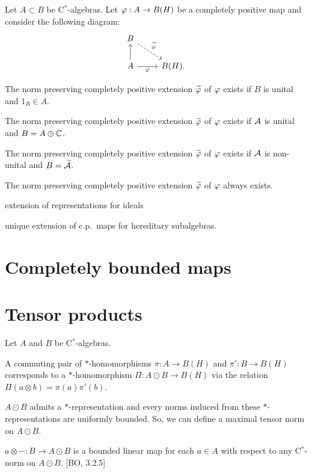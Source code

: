 \documentclass{../../large}
\begin{document}
\begin{prb}
Let $A\subset B$ be C$^*$-algebras.
Let $\varphi:A\to B(H)$ be a completely positive map and consider the following diagram:
\[\begin{tikzcd}
B\ar[dashed]{dr}{\tilde\f}&\\
A\ar{u}\ar[swap]{r}{\f}&B(H).
\end{tikzcd}\]
\begin{parts}
\item The norm preserving completely positive extension $\widetilde{\varphi}$ of $\varphi$ exists if $B$ is unital and $1_B\in A$.
\item The norm preserving completely positive extension $\widetilde{\varphi}$ of $\varphi$ exists if $\mathcal{A}$ is unital and $B=A\oplus\mathbb{C}$.
\item The norm preserving completely positive extension $\widetilde{\varphi}$ of $\varphi$ exists if $\mathcal{A}$ is non-unital and $B=\widetilde{\mathcal{A}}$.
\item The norm preserving completely positive extension $\widetilde{\varphi}$ of $\varphi$ always exists.
\end{parts}
\end{prb}

extension of representations for ideals

unique extension of c.p.~maps for hereditary subalgebras.



\section{Completely bounded maps}




\section{Tensor products}

\begin{prb}
Let $A$ and $B$ be C$^*$-algebras.
\begin{parts}
\item A commuting pair of $*$-homomorphisms $\pi:A\to B(H)$ and $\pi':B\to B(H)$ corresponds to a $*$-homomorphism $\Pi:A\odot B\to B(H)$ via the relation $\Pi(a\otimes b)=\pi(a)\pi'(b)$.
\item $A\odot B$ admits a $*$-representation and every norms induced from these $*$-representations are uniformly bounded. So, we can define a maximal tensor norm on $A\odot B$.
\item $a\otimes-:B\to A\odot B$ is a bounded linear map for each $a\in A$ with respect to any C$^*$-norm on $A\odot B$. [BO, 3.2.5]
\end{parts}
\end{prb}
\end{document}
